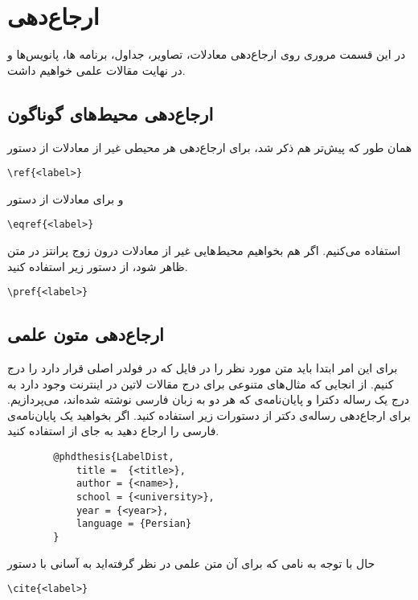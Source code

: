 \chapter{ارجاع‌دهی}
در این قسمت مروری روی ارجاع‌دهی معادلات، تصاویر، جداول، برنامه ها، پانویس‌ها و در نهایت مقالات علمی خواهیم داشت. 
\section{ارجاع‌دهی محیط‌های گوناگون}
همان طور که پیش‌تر هم ذکر شد، برای ارجاع‌دهی هر محیطی غیر از معادلات از دستور
\begin{latin}
	\noindent
	\verb*|\ref{<label>}|
\end{latin}
و برای معادلات از دستور 
\begin{latin}
	\noindent
	\verb*|\eqref{<label>}|
\end{latin}
استفاده می‌کنیم. اگر هم بخواهیم محیط‌هایی غیر از معادلات درون زوج پرانتز در متن ظاهر شود، از دستور زیر استفاده کنید.
\begin{latin}
	\noindent
	\verb*|\pref{<label>}|
\end{latin}


\section{ارجاع‌دهی متون علمی} 
برای این امر ابتدا باید متن مورد نظر را در فایل 
که در فولدر اصلی قرار دارد را درج کنیم. از انجایی که مثال‌های متنوعی برای درج مقالات لاتین در اینترنت وجود دارد به درج یک رساله دکترا و پایان‌نامه‌ی که هر دو به زبان فارسی نوشته شده‌اند، می‌پردازیم. برای ارجاع‌دهی رساله‌ی دکتر از دستورات زیر استفاده کنید. اگر بخواهید یک پایان‌نامه‌ی فارسی را ارجاع دهید به جای 
از 
استفاده کنید. 


\begin{latin}
	\begin{verbatim}
		@phdthesis{LabelDist,
			title =  {<title>},  
			author = {<name>},
			school = {<university>}, 
			year = {<year>}, 
			language = {Persian}
		}
	\end{verbatim}
\end{latin}
حال با توجه به نامی که برای آن متن علمی در نظر گرفته‌اید به آسانی با دستور 

\begin{latin}
	\noindent
	\verb*|\cite{<label>}| 
\end{latin}

